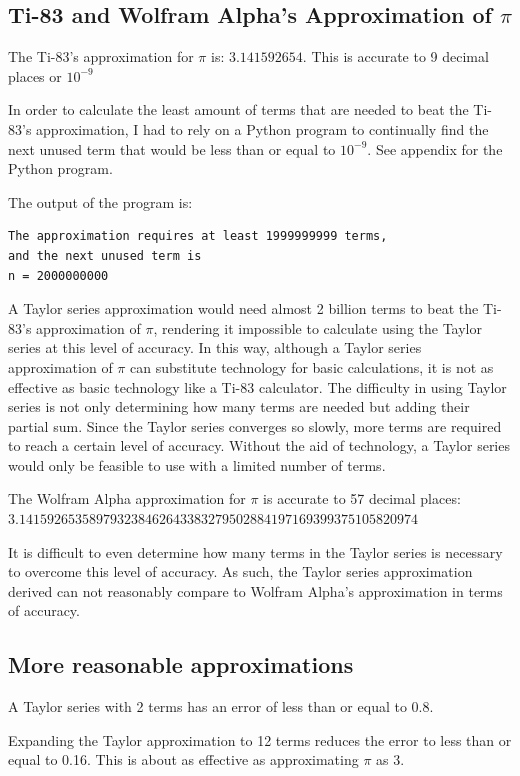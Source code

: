 \documentclass[12pt, titlepage]{article}
\begin{document}
\subsection{Ti-83 and Wolfram Alpha's Approximation of \(\pi\)}
The Ti-83's approximation for \(\pi\) is: \(3.141592654\). This is accurate to 9 decimal places or \(10^{-9}\)

In order to calculate the least amount of terms that are needed to beat the Ti-83's approximation, I had to rely on a Python program to continually find the next unused term that would be less than or equal to \(10^{-9}\). See appendix for the Python program.

The output of the program is:
\begin{verbatim}
The approximation requires at least 1999999999 terms, 
and the next unused term is 
n = 2000000000
\end{verbatim}

A Taylor series approximation would need almost 2 billion terms to beat the Ti-83's approximation of \(\pi\), rendering it impossible to calculate using the Taylor series at this level of accuracy. In this way, although a Taylor series approximation of \(\pi\) can substitute technology for basic calculations, it is not as effective as basic technology like a Ti-83 calculator. The difficulty in using Taylor series is not only determining how many terms are needed but adding their partial sum. Since the Taylor series converges so slowly, more terms are required to reach a certain level of accuracy. Without the aid of technology, a Taylor series would only be feasible to use with a limited number of terms.

The Wolfram Alpha approximation for \(\pi\) is accurate to 57 decimal places: \\
\(3.141592653589793238462643383279502884197169399375105820974\)

It is difficult to even determine how many terms in the Taylor series is necessary to overcome this level of accuracy. As such, the Taylor series approximation derived can not reasonably compare to Wolfram Alpha's approximation in terms of accuracy.

\subsection{More reasonable approximations}
A Taylor series with 2 terms has an error of less than or equal to 0.8.

Expanding the Taylor approximation to 12 terms reduces the error to less than or equal to 0.16. This is about as effective as approximating \(\pi\) as 3.
\end{document}
